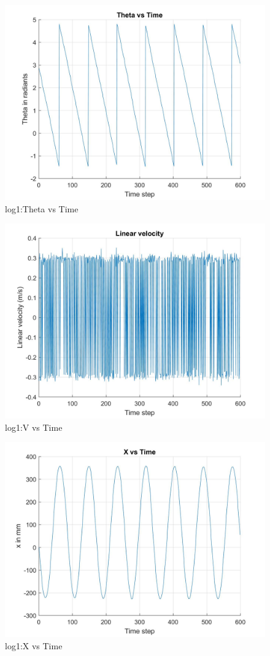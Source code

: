 \documentclass[paper=a4, fontsize=11pt]{scrartcl} %
\numberwithin{equation}{section} %
\numberwithin{figure}{section} %
\numberwithin{table}{section} %
\begin{document}
\begin{appendix}
\begin{figure}[H]
	\centering
	\includegraphics[width = 0.6\linewidth]{./figures/log1/thetaVsTime.jpg}
	\caption{log1:Theta vs Time}
\end{figure}

\begin{figure}[H]
	\centering
	\includegraphics[width = 0.6\linewidth]{./figures/log1/vVsTime.jpg}
	\caption{log1:V vs Time}
\end{figure}

\begin{figure}[H]
	\centering
	\includegraphics[width = 0.6\linewidth]{./figures/log1/xVsTime.jpg}
	\caption{log1:X vs Time}
\end{figure}


\end{appendix}
\end{document}
